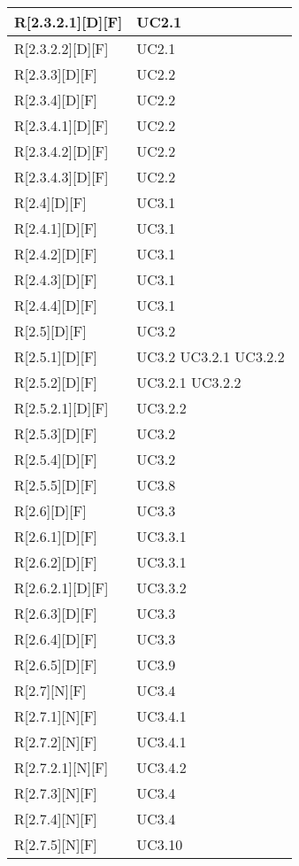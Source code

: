 \begin{longtable}{X | X}
\hline
R[2.3.2.1][D][F] & UC2.1 \\
\hline
R[2.3.2.2][D][F] & UC2.1 \\
\hline
R[2.3.3][D][F] & UC2.2 \\
\hline
R[2.3.4][D][F] & UC2.2 \\
\hline
R[2.3.4.1][D][F] & UC2.2 \\
\hline
R[2.3.4.2][D][F] & UC2.2 \\
\hline
R[2.3.4.3][D][F] & UC2.2 \\
\hline
R[2.4][D][F] & UC3.1 \\
\hline
R[2.4.1][D][F] & UC3.1 \\
\hline
R[2.4.2][D][F] & UC3.1 \\
\hline
R[2.4.3][D][F] & UC3.1 \\
\hline
R[2.4.4][D][F] & UC3.1 \\
\hline
R[2.5][D][F] & UC3.2 \\
\hline
R[2.5.1][D][F] & UC3.2 \newline UC3.2.1 \newline UC3.2.2 \\
\hline
R[2.5.2][D][F] & UC3.2.1 \newline UC3.2.2 \\
\hline
R[2.5.2.1][D][F] & UC3.2.2 \\
\hline
R[2.5.3][D][F] & UC3.2 \\
\hline
R[2.5.4][D][F] & UC3.2 \\
\hline
R[2.5.5][D][F] & UC3.8 \\
\hline
R[2.6][D][F] & UC3.3 \\
\hline
R[2.6.1][D][F] & UC3.3.1 \\
\hline
R[2.6.2][D][F] & UC3.3.1 \\
\hline
R[2.6.2.1][D][F] & UC3.3.2 \\
\hline
R[2.6.3][D][F] & UC3.3 \\
\hline
R[2.6.4][D][F] & UC3.3 \\
\hline
R[2.6.5][D][F] & UC3.9 \\
\hline
R[2.7][N][F] & UC3.4 \\
\hline
R[2.7.1][N][F] & UC3.4.1 \\
\hline
R[2.7.2][N][F] & UC3.4.1 \\
\hline
R[2.7.2.1][N][F] & UC3.4.2 \\
\hline
R[2.7.3][N][F] & UC3.4 \\
\hline
R[2.7.4][N][F] & UC3.4 \\
\hline
R[2.7.5][N][F] & UC3.10 \\

\end{longtable}
